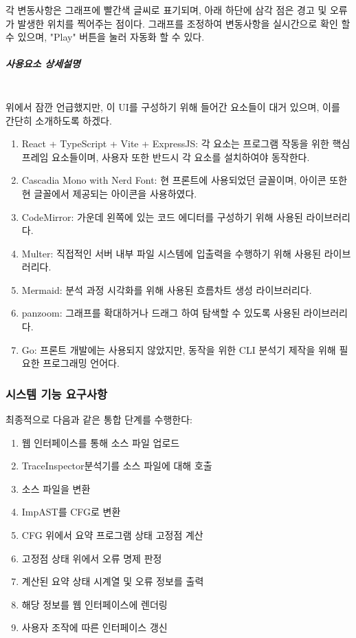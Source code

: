 \documentclass[a4paper,12pt]{article}
\newcommand{\imp}{\textsf{Imp}}
\newcommand{\traceinspector}{\textsf{TraceInspector}}
\begin{document}
각 변동사항은 그래프에 빨간색 글씨로 표기되며, 아래 하단에 삼각 점은 경고 및 오류가 발생한 위치를 찍어주는 점이다.
그래프를 조정하여 변동사항을 실시간으로 확인 할 수 있으며, "Play" 버튼을 눌러 자동화 할 수 있다.

\subparagraph{사용요소 상세설명} ~\\

위에서 잠깐 언급했지만, 이 UI를 구성하기 위해 들어간 요소들이 대거 있으며, 이를 간단히 소개하도록 하겠다.

\begin{enumerate}
    \item React + TypeScript + Vite + ExpressJS: 각 요소는 프로그램 작동을 위한 핵심 프레임 요소들이며, 사용자 또한 반드시 각 요소를 설치하여야 동작한다.
    \item Cascadia Mono with Nerd Font: 현 프론트에 사용되었던 글꼴이며, 아이콘 또한 현 글꼴에서 제공되는 아이콘을 사용하였다.
    \item CodeMirror: 가운데 왼쪽에 있는 코드 에디터를 구성하기 위해 사용된 라이브러리다.
    \item Multer: 직접적인 서버 내부 파일 시스템에 입출력을 수행하기 위해 사용된 라이브러리다.
    \item Mermaid: 분석 과정 시각화를 위해 사용된 흐름차트 생성 라이브러리다.
    \item panzoom: 그래프를 확대하거나 드래그 하여 탐색할 수 있도록 사용된 라이브러리다.
    \item Go: 프론트 개발에는 사용되지 않았지만, 동작을 위한 CLI 분석기 제작을 위해 필요한 프로그래밍 언어다.
\end{enumerate}

\subsubsection{시스템 기능 요구사항}

최종적으로  다음과 같은 통합 단계를 수행한다:

\begin{enumerate}
    \item 웹 인터페이스를 통해 소스 파일 업로드
    \item \traceinspector 분석기를 소스 파일에 대해 호출
    \item 소스 파일을  변환
    \item \imp AST를 CFG로 변환
    \item CFG 위에서 요약 프로그램 상태 고정점 계산
    \item 고정점 상태 위에서 오류 명제 판정
    \item 계산된 요약 상태 시계열 및 오류 정보를 출력
    \item 해당 정보를 웹 인터페이스에 렌더링
    \item 사용자 조작에 따른 인터페이스 갱신
\end{enumerate}
\end{document}
